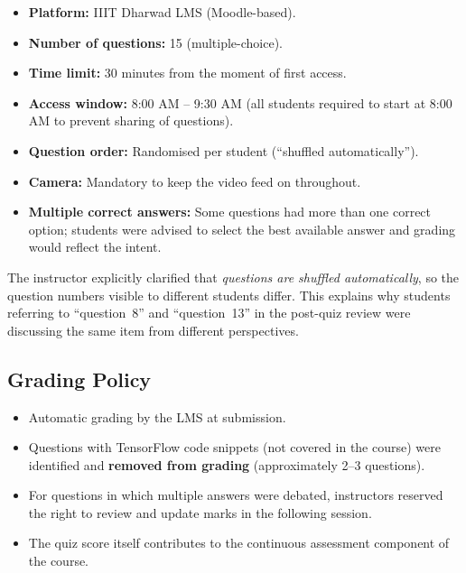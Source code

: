 \documentclass[12pt,a4paper]{article}
\begin{document}
\begin{itemize}[leftmargin=1.5cm]
  \item \textbf{Platform:} IIIT Dharwad LMS (Moodle-based).
  \item \textbf{Number of questions:} 15 (multiple-choice).
  \item \textbf{Time limit:} 30 minutes from the moment of first access.
  \item \textbf{Access window:} 8:00 AM -- 9:30 AM (all students required
        to start at 8:00 AM to prevent sharing of questions).
  \item \textbf{Question order:} Randomised per student
        (``shuffled automatically'').
  \item \textbf{Camera:} Mandatory to keep the video feed on throughout.
  \item \textbf{Multiple correct answers:} Some questions had more than
        one correct option; students were advised to select the best
        available answer and grading would reflect the intent.
\end{itemize}

\begin{keyinsight}
  The instructor explicitly clarified that \emph{questions are shuffled
  automatically}, so the question numbers visible to different students
  differ.  This explains why students referring to ``question~8'' and
  ``question~13'' in the post-quiz review were discussing the same item
  from different perspectives.
\end{keyinsight}

\subsection{Grading Policy}
\label{ssec:grading}

\begin{itemize}[leftmargin=1.5cm]
  \item Automatic grading by the LMS at submission.
  \item Questions with TensorFlow code snippets (not covered in the
        course) were identified and \textbf{removed from grading}
        (approximately 2--3 questions).
  \item For questions in which multiple answers were debated,
        instructors reserved the right to review and update marks
        in the following session.
  \item The quiz score itself contributes to the continuous assessment
        component of the course.
\end{itemize}
\end{document}
